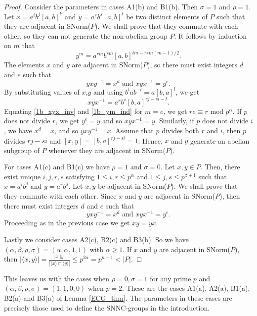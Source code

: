 \begin{proof}
Consider the parameters in cases A1(b) and B1(b). Then $\sigma = 1$ and $\rho = 1$. Let $x=a^ib^j[a,b]^k$ and $y=a^rb^s[a,b]^t$ be two distinct elements of $P$ such that they are adjacent in SNorm($P$). We shall prove that they commute with each other, so they can not generate the non-abelian group $P$. It follows by induction on $m$ that
    \begin{equation}\label{1b_ym_ind}
        y^m = a^{rm}b^{sm}[a,b]^{tm-rsm(m-1)/2}.
    \end{equation}
The elements $x$ and $y$ are adjacent in SNorm($P$), so there must exist integers $d$ and $e$ such that $$yxy^{-1}=x^d \mbox{ and } xyx^{-1} =y^e.$$ 
    By substituting values of $x$,$y$ and using $b^lab^{-l} = a[b,a]^l$, we get 
    \begin{equation}\label{1b_xyx_inv}
        xyx^{-1} = a^rb^s[b,a]^{rj-si-t}.
    \end{equation}
    Equating \ref{1b_xyx_inv} and \ref{1b_ym_ind} for $m=e$, we get $re \equiv r \mbox{ mod } p^{\alpha}$. If $p$ does not divide $r$, we get $y^e=y$ and so $xyx^{-1}=y$. Similarly, if $p$ does not divide $i$, we have $x^d=x$, and so $yxy^{-1}=x$. Assume that $p$ divides both $r$ and $i$, then $p$ divides $rj-si$ and $[x,y] = [b,a]^{rj-si} = 1$. Hence, $x$ and $y$ generate an abelian subgroup of $P$ whenever they are adjacent in SNorm($P$).
    
    For cases A1(c) and B1(c) we have $\rho = 1$ and $\sigma = 0$. Let $x,y \in P$. Then, there exist unique $i,j,r,s$ satisfying $1 \leq i,r \leq p^{\alpha}$ and $1 \leq j,s \leq p^{\beta + 1}$ such that $x=a^ib^j$ and $y=a^rb^s$. Let $x,y$ be adjacent in SNorm($P$). We shall prove that they commute with each other. Since $x$ and $y$ are adjacent in SNorm($P$), then there must exist integers $d$ and $e$ such that $$yxy^{-1}=x^d \mbox{ and } xyx^{-1} =y^e.$$ 
Proceeding as in the previous case we get $xy=yx$.

Lastly we consider cases A2(c), B2(c) and B3(b). So we have $(\alpha, \beta, \rho, \sigma) = (\alpha, \alpha, 1, 1)$ with $\alpha \geq 1$. If $x$ and $y$ are adjacent in SNorm($P$), then $|\langle x,y \rangle| = \frac{|x||y|}{|\langle x \rangle \cap \langle y \rangle|}  \leq p^{2\alpha} = p^{n-1} < |P|$.  
\end{proof}
This leaves us with the cases when $\rho=0, \sigma=1$ for any prime $p$ and $(\alpha, \beta, \rho, \sigma) = (1, 1, 0, 0)$ when $p=2$. These are the cases A1(a), A2(a), B1(a), B2(a) and B3(a) of Lemma \ref{ECG_thm}. The parameters in these cases are precisely those used to define the SNNC-groups in the introduction.
 
